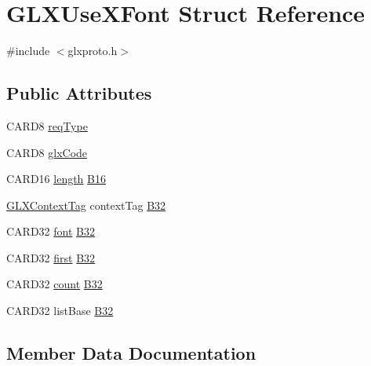 \hypertarget{struct_g_l_x_use_x_font}{}\section{G\+L\+X\+Use\+X\+Font Struct Reference}
\label{struct_g_l_x_use_x_font}


{\ttfamily \#include $<$glxproto.\+h$>$}

\subsection*{Public Attributes}
\begin{DoxyCompactItemize}
\item 
C\+A\+R\+D8 \hyperlink{struct_g_l_x_use_x_font_ade77855eafe662b62370afb5ebbfb1b7}{req\+Type}
\item 
C\+A\+R\+D8 \hyperlink{struct_g_l_x_use_x_font_adac6fe4ea790090beadf7b69e17e9b20}{glx\+Code}
\item 
C\+A\+R\+D16 \hyperlink{glcorearb_8h_ab9c919755bde3b34349e23a32b4e0fa7}{length} \hyperlink{struct_g_l_x_use_x_font_abc9994be3419b0a14ded080a3d561a4a}{B16}
\item 
\hyperlink{glxproto_8h_ae71763ce00c9fa460beb4699af678691}{G\+L\+X\+Context\+Tag} context\+Tag \hyperlink{struct_g_l_x_use_x_font_ad0107feed830b35a6ee50be4b8f404e6}{B32}
\item 
C\+A\+R\+D32 \hyperlink{cad_8h_abf5bfa705e66ffc1ddaa6ce46c960873}{font} \hyperlink{struct_g_l_x_use_x_font_ac8d9f7af56cfee56e7136acc1be54172}{B32}
\item 
C\+A\+R\+D32 \hyperlink{glcorearb_8h_ada771a798be00a696d20928c9a3371e7}{first} \hyperlink{struct_g_l_x_use_x_font_ae33ce9ccc5a97b08184f87aba65cb743}{B32}
\item 
C\+A\+R\+D32 \hyperlink{gl_8h_a619bc20e8198de3bd3f3d7fc34de66b2}{count} \hyperlink{struct_g_l_x_use_x_font_aee1e910b439d2824694525d1049e38d3}{B32}
\item 
C\+A\+R\+D32 list\+Base \hyperlink{struct_g_l_x_use_x_font_a45191243444ebcad2fb6efacb37c06c1}{B32}
\end{DoxyCompactItemize}


\subsection{Member Data Documentation}
\mbox{\label{struct_g_l_x_use_x_font_abc9994be3419b0a14ded080a3d561a4a}} 
